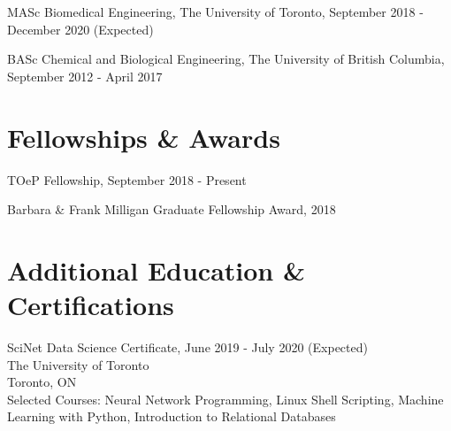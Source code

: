 \documentclass[letterpaper]{article}
\renewenvironment{itemize}{
  \begin{list}{}{
    \setlength{\leftmargin}{1.5em}
  }
}{
  \end{list}
}
\begin{document}
\begin{itemize}
\item MASc Biomedical Engineering, The University of Toronto, September 2018 - December 2020 (Expected)
\end{itemize}

\begin{itemize}
  \item BASc Chemical and Biological Engineering, The University of British Columbia, September 2012 - April 2017
\end{itemize}

\section*{\textbf{Fellowships \& Awards}}
\begin{itemize}
    \item TOeP Fellowship, September 2018 - Present
    \item Barbara \& Frank Milligan Graduate Fellowship Award, 2018
\end{itemize}

\section*{\textbf{Additional Education \& Certifications}}

\begin{itemize}
    \item SciNet Data Science Certificate, June 2019 - July 2020 (Expected)
    \\The University of Toronto
    \\Toronto, ON
    \\Selected Courses: Neural Network Programming, Linux Shell Scripting, Machine Learning with Python, Introduction to Relational Databases
\end{itemize}
\end{document}
